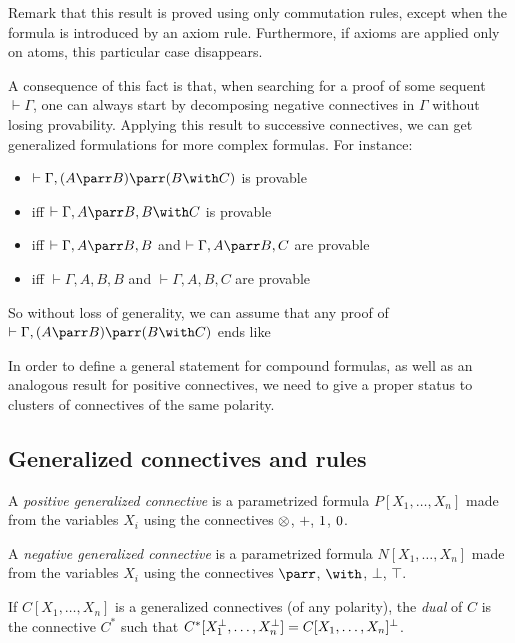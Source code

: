 Remark that this result is proved using only commutation rules, except
when the formula is introduced by an axiom rule. Furthermore, if axioms
are applied only on atoms, this particular case disappears.

A consequence of this fact is that, when searching for a proof of some
sequent \(\vdash\Gamma\), one can always start by decomposing negative
connectives in \(\Gamma\) without losing provability. Applying this
result to successive connectives, we can get generalized formulations
for more complex formulas. For instance:
\begin{itemize}
\item
  \(\vdash\Gamma,(A\parr B)\parr(B\with C)\) is provable
\item
  iff \(\vdash\Gamma,A\parr B,B\with C\) is provable
\item
  iff \(\vdash\Gamma,A\parr B,B\) and \(\vdash\Gamma,A\parr B,C\) are
  provable
\item
  iff \(\vdash\Gamma,A,B,B\) and \(\vdash\Gamma,A,B,C\) are provable
\end{itemize}

So without loss of generality, we can assume that any proof of
\(\vdash\Gamma,(A\parr B)\parr(B\with C)\) ends like
\begin{prooftree}
\end{prooftree}

In order to define a general statement for compound formulas, as well as
an analogous result for positive connectives, we need to give a proper
status to clusters of connectives of the same polarity.

\subsection{Generalized connectives and
rules}\label{generalized-connectives-and-rules}

\begin{definition}
A \emph{positive generalized connective} is a parametrized formula
$P[X_1,\ldots,X_n]$ made from the variables $X_i$ using the connectives
$\tens$, $\plus$, $\one$, $\zero$.

A \emph{negative generalized connective} is a parametrized formula
$N[X_1,\ldots,X_n]$ made from the variables $X_i$ using the connectives
$\parr$, $\with$, $\bot$, $\top$.

If $C[X_1,\ldots,X_n]$ is a generalized connectives (of any polarity), the
\emph{dual} of $C$ is the connective $C^*$ such that
$C^*[X_1\orth,\ldots,X_n\orth]=C[X_1,\ldots,X_n]\orth$.
\end{definition}

